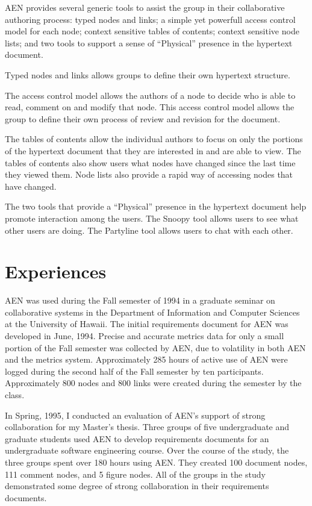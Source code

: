 AEN provides several generic tools to assist the group in their
collaborative authoring process: typed nodes and links; a simple yet
powerfull access control model for each node; context sensitive tables of
contents; context sensitive node lists; and two tools to support a sense of
``Physical'' presence in the hypertext document.

Typed nodes and links allows groups to define their own hypertext
structure.  

The access control model allows the authors of a node to decide who is able
to read, comment on and modify that node.  This access control model allows
the group to define their own process of review and revision for the
document.

The tables of contents allow the individual authors to focus on only the
portions of the hypertext document that they are interested in and are able
to view.  The tables of contents also show users what nodes have changed
since the last time they viewed them.  Node lists also provide a rapid way
of accessing nodes that have changed.

The two tools that provide a ``Physical'' presence in the hypertext
document help promote interaction among the users.  The Snoopy tool allows
users to see what other users are doing.  The Partyline tool allows users
to chat with each other.

\section{Experiences}

AEN was used during the Fall semester of 1994 in a graduate seminar on
collaborative systems in the Department of Information and Computer
Sciences at the University of Hawaii. The initial requirements document for
AEN \cite{csdl-94-06} was developed in June, 1994. Precise and accurate
metrics data for only a small portion of the Fall semester was collected by
AEN, due to volatility in both AEN and the metrics system.  Approximately
285 hours of active use of AEN were logged during the second half of the
Fall semester by ten participants.  Approximately 800 nodes and 800 links
were created during the semester by the class.

In Spring, 1995, I conducted an evaluation of AEN's support of strong
collaboration for my Master's thesis.  Three groups of five undergraduate
and graduate students used AEN to develop requirements documents for an
undergraduate software engineering course.  Over the course of the study,
the three groups spent over 180 hours using AEN. They created 100 document
nodes, 111 comment nodes, and 5 figure nodes.  All of the groups in the
study demonstrated some degree of strong collaboration in their
requirements documents.

